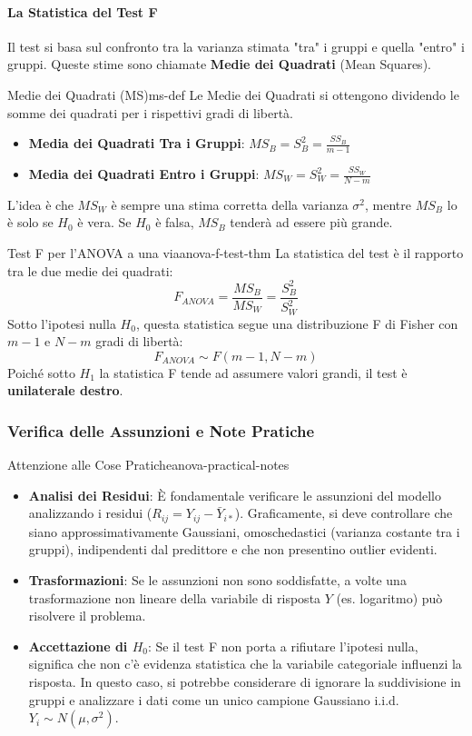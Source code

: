 \paragraph{La Statistica del Test F}
Il test si basa sul confronto tra la varianza stimata "tra" i gruppi e quella "entro" i gruppi. Queste stime sono chiamate \textbf{Medie dei Quadrati} (Mean Squares).

\begin{definizione}{Medie dei Quadrati (MS)}{ms-def}
Le Medie dei Quadrati si ottengono dividendo le somme dei quadrati per i rispettivi gradi di libertà.
\begin{itemize}
    \item \textbf{Media dei Quadrati Tra i Gruppi}: \( MS_B = S_B^2 = \frac{SS_B}{m-1} \)
    \item \textbf{Media dei Quadrati Entro i Gruppi}: \( MS_W = S_W^2 = \frac{SS_W}{N-m} \)
\end{itemize}
L'idea è che \(MS_W\) è sempre una stima corretta della varianza \(\sigma^2\), mentre \(MS_B\) lo è solo se \(H_0\) è vera. Se \(H_0\) è falsa, \(MS_B\) tenderà ad essere più grande.
\end{definizione}

\begin{teorema}{Test F per l'ANOVA a una via}{anova-f-test-thm}
La statistica del test è il rapporto tra le due medie dei quadrati:
\[ F_{ANOVA} = \frac{MS_B}{MS_W} = \frac{S_B^2}{S_W^2} \]
Sotto l'ipotesi nulla \(H_0\), questa statistica segue una distribuzione F di Fisher con \(m-1\) e \(N-m\) gradi di libertà:
\[ F_{ANOVA} \sim F(m-1, N-m) \]
Poiché sotto \(H_1\) la statistica F tende ad assumere valori grandi, il test è \textbf{unilaterale destro}.
\end{teorema}

\subsubsection{Verifica delle Assunzioni e Note Pratiche}
\begin{nota}{Attenzione alle Cose Pratiche}{anova-practical-notes}
\begin{itemize}
    \item \textbf{Analisi dei Residui}: È fondamentale verificare le assunzioni
    del modello analizzando i residui (\(R_{ij} = Y_{ij} - \bar{Y}_{i*}\)).
    Graficamente, si deve controllare che siano approssimativamente Gaussiani,
    omoschedastici (varianza costante tra i gruppi), indipendenti dal predittore
    e che non presentino outlier evidenti.
    \item \textbf{Trasformazioni}: Se le assunzioni non sono soddisfatte, a
    volte una trasformazione non lineare della variabile di risposta \(Y\) (es.
    logaritmo) può risolvere il problema.
    \item \textbf{Accettazione di \(H_0\)}: Se il test F non porta a rifiutare
    l'ipotesi nulla, significa che non c'è evidenza statistica che la variabile
    categoriale influenzi la risposta. In questo caso, si potrebbe considerare
    di ignorare la suddivisione in gruppi e analizzare i dati come un unico
    campione Gaussiano i.i.d. \(Y_i \sim N(\mu, \sigma^2)\).
\end{itemize}
\end{nota}
